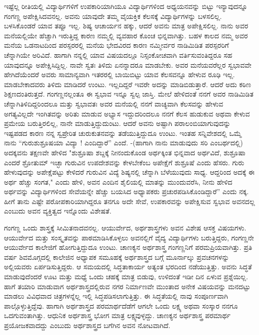 {ಇಷ್ಟೆಲ್ಲ ರೀತಿಯಲ್ಲಿ ವಿದ್ಯಾರ್ಥಿಗಳಿಗೆ ಉಪಕಾರಿಯಾಗಿಯೂ ವಿದ್ಯಾರ್ಥಿಗಳಿಂದ ಅಧ್ಯಯನವನ್ನು ಬಿಟ್ಟು ಇನ್ಯಾವುದನ್ನೂ ಗಂಗಣ್ಣ ಅಪೇಕ್ಷಿಸಿದವನಲ್ಲ. ಅವನು ಯಾವುದೇ ತಮ್ಮ ವೈಯಕ್ತಿಕ ಕೆಲಸಕ್ಕೆ ವಿದ್ಯಾರ್ಥಿಗಳನ್ನು ಬಳಸಲಿಲ್ಲ. ಬಳಸಿಕೊಂಡರೆ ಯಾವ ತಪ್ಪೂ ಇಲ್ಲ. ಶಿಷ್ಯ ಆಚಾರ್ಯನ ಹಕ್ಕು, ಆದರೆ ಅವನು ಮಾತ್ರ  ಅಪೇಕ್ಷಿಸಲಿಲ್ಲ. ನಾನು ಅವರ ಮನೆಯಲ್ಲಿಯೇ ಹೆಚ್ಚಾಗಿ ಇರುತ್ತಿದ್ದ ಕಾರಣ ನಮ್ಮಲ್ಲಿ ವ್ಯವಹಾರ ಕೊಂಚ \hbox{ಭಿನ್ನವಾಗಿತ್ತು.} ಬಹಳ ಕಾಲದ ನಮ್ಮ ಅವರ ಮನೆಯ ಒಡನಾಟದಿಂದ \hbox{ಪರಸ್ಪರರಲ್ಲಿ} ಮನೆಯ ಭೇದ\-ವಿರದ ಕಾರಣ ನಮ್ಮೀರ್ವರ ನಾಡಿಮಿಡಿತ \hbox{ಪರಸ್ಪರರಿಗೆ} ಚೆನ್ನಾಗಿಯೇ ಅರಿವಿದೆ. ಹಾಗಾಗಿ ನನ್ನಲ್ಲಿ ಯಾವ ವಿಷಯದಲ್ಲೂ ನಿಸ್ಸಂಕೋಚವಾಗಿ ವರ್ತಿಸು\-ವಂತಿದ್ದರೂ ಸಹ ಯಾವುದನ್ನೂ ಅಪೇಕ್ಷಿಸಿದ್ದಿಲ್ಲ. ನಾವೇ ಸ್ವತಃ ತಿಳಿದು \hbox{ಏನನ್ನಾದರೂ} ಮಾಡಬೇಕು. ಅವರ ಮನೆಯವರೆಲ್ಲರ  ಸ್ವಭಾವವೇ ಹೇಗಿದೆಯೆಂದರೆ ಅವರು ಸಾಮಾನ್ಯವಾಗಿ ಇತರರಲ್ಲಿ ಬಾಯಿಬಿಟ್ಟು ಯಾವ ಕೆಲಸವನ್ನೂ ಹೇಳುವ ರೂಢಿ ಇಲ್ಲ. ಮಾಡಬೇಕಾದವರು ತಿಳಿದು ಮಾಡಿದರೆ ಉಂಟು. ಇಲ್ಲದಿದ್ದರೆ ಇವರೇ ಅದನ್ನು ಮಾಡಿಬಿಡುತ್ತಾರೆ. ಆದರೆ ಅದು ಕಠಿಣ ಶಿಕ್ಷಣದಂತಿರುತ್ತದೆ. ಗಂಗಣ್ಣನಲ್ಲಂತೂ ಈ ಸ್ವಭಾವ ಇನ್ನೂ ಸ್ವಲ್ಪ ಜಾಸ್ತಿ. ಮೇಲೆ ಹೇಳಿದಂತೆ ನನಗೆ ಅವರ ನಾಡಿಮಿಡಿತ ಚೆನ್ನಾಗಿ\break ತಿಳಿದಿದ್ದರಿಂದಲೂ ಮತ್ತು ಸ್ವಭಾವತಃ ಅವರ ಮನೆಯಲ್ಲಿ ನನಗೆ ವಾಚ್ಯವಾಗಿ ಕೆಲಸವನ್ನು ಹೇಳುವ ಅಗತ್ಯವಿಲ್ಲದೇ ಇಂಗಿತವನ್ನು ಅರಿತು ಮಾಡುವ ಅಭ್ಯಾಸ ಇದ್ದುದರಿಂದಲೂ ನನಗೆ ಕೆಲಸ ಹುಡುಕುವ ಅಥವಾ ಕೇಳುವ ಪ್ರಮೇಯ ಬರುತ್ತಿರಲಿಲ್ಲ, ನಾನೇ ಮಾಡುತ್ತಿದ್ದುದುಂಟು. ಆದರೆ ಅವನು ಅಷ್ಟಾಗಿ ಪರಾಲಂಬಿಯಾಗುವುದನ್ನು ಇಷ್ಟಪಡದ ಕಾರಣ ನನ್ನ ಸ್ವಪ್ರೇರಿತ ಚುರುಕುತನವನ್ನು  ತಡೆಯುತ್ತಿದ್ದುದೂ ಉಂಟು. ಇಂತಹ ಸನ್ನಿವೇಶದಲ್ಲಿ ಒಮ್ಮೆ ನಾನು “ಗುರುಶುಶ್ರೂಷಯಾ ವಿದ್ಯಾ  ! ಎಂದಿದ್ದಾರೆ” ಎಂದೆ. -(ಹಾಗಾಗಿ ನಾನು ಮಾಡುವುದು  ಸರಿ ಎಂಬರ್ಥದಲ್ಲಿ) ಅದಕ್ಕವನು ತಕ್ಷಣವೇ ಹೇಳಿದ \enginline{-} \hbox{"ಶುಶ್ರೂಷಾ} ಶಬ್ದಕ್ಕೆ ನೀನಂದುಕೊಂಡ ಅರ್ಥಕ್ಕಿಂತ ಭಿನ್ನವಾದ ಅರ್ಥವಿದೆ, \hbox{ಶುಶ್ರೂಷಾ} ಎಂದರೆ \hbox{ಶ್ರೋತುಮ್} ಇಚ್ಛಾ \enginline{-}ಗುರುವಿನ ಉಪದೇಶವನ್ನು ಕೇಳಬೇಕೆಂಬ ಅಪೇಕ್ಷೆಗೆ \hbox{ಶುಶ್ರೂಷೆ} ಎಂದು ಹೆಸರು. ಗುರು ಹೇಳುವುದನ್ನು ಅಪೇಕ್ಷೆಪಟ್ಟು ಕೇಳಿದರೆ ಗುರುವಿನ ವಿದ್ಯೆ ಶಿಷ್ಯನಲ್ಲಿ ಚೆನ್ನಾಗಿ \hbox{ಬೆಳೆಯುವುದು} ಸಾಧ್ಯ. ಆದ್ದರಿಂದ ಅದಕ್ಕೆ ಈ ಅರ್ಥ ಹೆಚ್ಚು ಸಂಗತ," ಎಂದು ಹೇಳಿ, ಅವನ ಎಂದಿನ ಶೈಲಿಯಲ್ಲಿ ಮಾತನ್ನು ಮುಂದುವರೆಸಿ, ನೀನು ಹೇಳಿದ ಅರ್ಥವನ್ನು ವಿದ್ಯಾರ್ಥಿಗಳಿಂದ \hbox{ಸೇವೆಯನ್ನೇ} ಹೆಚ್ಚು ಬಯಸಿದ ಅಧ್ಯಾಪಕರು ಪ್ರಚುರಪಡಿಸಿ\-ಕೊಂಡಿದ್ದಾರೆ” ಎಂದು ನಕ್ಕ. ಹೀಗೆ ತಾನು ಎಷ್ಟೇ ಪರೋಪಕಾರಿ\-ಯಾಗಿದ್ದರೂ ತನಗೂ ಅದೇ ಸೇವೆ, ಉಪಕಾರವನ್ನು ಅಪೇಕ್ಷಿಸುವ ಸ್ವಭಾವ ಅವನದಲ್ಲ ಎಂಬುದು ಅವನ ವ್ಯಕ್ತಿತ್ವದ ಇನ್ನೊಂದು ವಿಶೇಷತೆ.
\vskip 8pt

ಗಂಗಣ್ಣ ಒಂದು ಶಾಸ್ತ್ರಕ್ಕೆ ಸೀಮಿತನಾದವನಲ್ಲ. ಆಯುರ್ವೇದ, ಅರ್ಥಶಾಸ್ತ್ರಗಳು ಅವನ ವಿಶೇಷ ಆಸಕ್ತ ವಿಷಯಗಳು. ಆಯುರ್ವೇದ ಮತ್ತು ಸಂಸ್ಕೃತವನ್ನು ಪಾಠ\-ಮಾಡಿಸಿಕೊಳ್ಳಲು ಅವನಲ್ಲಿಗೆ ವೈದ್ಯ ವಿದ್ಯಾರ್ಥಿಗಳು ಬರುತ್ತಿದ್ದರು, ಗಂಗಣ್ಣನೇ ಆಯುರ್ವೇದ ಕಾಲೇಜಿಗೆ ಹೋಗುತ್ತಿದ್ದುದೂ ಉಂಟು. ಚಾಣಕ್ಯನ ಅರ್ಥಶಾಸ್ತ್ರ ಗಂಗಣ್ಣನಿಗೆ ಪರಮ\-ಪ್ರಿಯವಾಗಿತ್ತು. ಪ್ರತಿ ವರ್ಷ ಶಿವಮೊಗ್ಗದಲ್ಲಿ ಕಾಲೇಜಿನ ಅಧ್ಯಾಪಕ ಸಮೂಹಕ್ಕೆ ಅರ್ಥಶಾಸ್ತ್ರದ ಬಗ್ಗೆ ಮೂರ್ನಾಲ್ಕು ಪ್ರವಚನಗಳನ್ನು ಅಲ್ಲಿಯವರು ಏರ್ಪಡಿಸುತ್ತಿದ್ದರು. ಆ ಸಮಯದಲ್ಲಿ ಸಿದ್ಧತಾಕಾರ್ಯ ಅತ್ಯಂತ ಭರದಿಂದ ನಡೆಯುತ್ತಿತ್ತು. ಅವನು ಸಿದ್ಧತೆ \hbox{ಮಾಡುವುದೆಂದರೆ} ಊಟ ಮತ್ತು ಮಧ್ಯೆ ಒಂದು ಚಹಕ್ಕೆ  ಮಾತ್ರ ಬಿಡುವು, ಉಳಿದಂತೆ ಇಡೀ ದಿನ ಏಳುವ ಪ್ರಶ್ನೆಯಿಲ್ಲ. ಹಾಗೆ ತಯಾರಿ ಮಾಡುವಾಗ ಅರ್ಥಶಾಸ್ತ್ರದಲ್ಲಿರುವ ನಗರ ನಿರ್ಮಾಣವೇ ಮುಂತಾದ ಅನೇಕ ವಿಷಯವನ್ನು ಮನದಟ್ಟು ಮಾಡಲು ವಿವಿಧವಾದ ಚಿತ್ರ\-ಗಳನ್ನೆಲ್ಲ ಇಲ್ಲಿ ಸಿದ್ಧಪಡಿಸಲಾಗುತ್ತಿತ್ತು. ಈ ಸಿದ್ಧತೆಯಲ್ಲಿ  ನಾವು ಸಂಪೂರ್ಣವಾಗಿ ಪಾಲ್ಗೊಳ್ಳು\-ತ್ತಿದ್ದೆವು. ಹಾಗಾಗಿ ಅರ್ಥಶಾಸ್ತ್ರದ ಪರಮಾರ್ಥದೆಡೆಗೆ ಆಗಲೇ ಒಂದು ಲಕ್ಷ್ಯ ಅಥವಾ ಸಂಸ್ಕಾರ ನನಗೂ ಒದಗುವಂತಾಗಿತ್ತು. ಆಧುನಿಕ ಅರ್ಥಶಾಸ್ತ್ರ ಭೋಗ ಮಾತ್ರ ಲಕ್ಷ್ಯವುಳ್ಳದ್ದು. ಚಾಣಕ್ಯನ ಅರ್ಥಶಾಸ್ತ್ರ ಪರಮಾರ್ಥ ಪ್ರಯೋಜಕವಾದದ್ದು  ಎಂಬುದು ಅರ್ಥಶಾಸ್ತ್ರದ ಬಗೆಗಿನ ಅವನ ನೋಟವಾಗಿದೆ.

}
